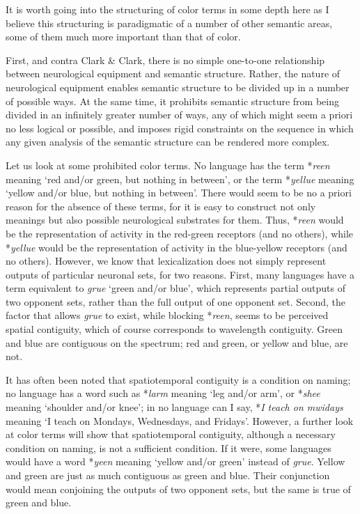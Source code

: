 It is worth going into the structuring of color terms in some depth here as I believe this structuring is paradigmatic of a number of other semantic areas, some of them much more important than that of color.

First, and contra Clark \& Clark, there is no simple one-to-one relationship between neurological equipment and semantic structure. Rather, the nature of neurological equipment enables semantic structure to be divided up in a number of possible ways. At the same time, it prohibits semantic structure from being divided in an infinitely greater number of ways, any of which might seem a priori no less logical or possible, and imposes rigid constraints on the sequence in which any given analysis of the semantic structure can be rendered more complex.

Let us look at some prohibited color terms. No language has the term *\textit{reen} meaning `red and/or green, but nothing in between', or the term *\textit{yellue} meaning `yellow and/or blue, but nothing in between'. There would seem to be no a priori reason for the absence of these terms, for it is easy to construct not only meanings but also possible neurological substrates for them. Thus, *\textit{reen} would be the representation of activity in the red-green receptors (and no others), while *\textit{yellue} would be the representation of activity in the blue-yellow receptors (and no others). However, we know that lexicalization does not simply represent outputs of particular neuronal sets, for two reasons. First, many languages have a term equivalent to \textit{grue} `green and/or blue', which represents partial outputs of two opponent sets, rather than the full output of one opponent set. Second, the factor that allows \textit{grue} to exist, while blocking *\textit{reen}, seems to be perceived spatial contiguity, which of course corresponds to wavelength contiguity. Green and blue are contiguous on the spectrum; red and green, or yellow and blue, are not.

It has often been noted that spatiotemporal contiguity is a condition on naming; no language has a word such as *\textit{larm} meaning `leg and/or arm', or *\textit{shee} meaning `shoulder and/or knee'; in no language can I say, *\textit{I teach on mwidays} meaning `I teach on Mondays, Wednesdays, and Fridays'. However, a further look at color terms will show that spatiotemporal contiguity, although a necessary condition on naming, is not a sufficient condition. If it were, some languages would have a word *\textit{yeen} meaning `yellow and/or green' instead of \textit{grue}. Yellow and green are just as much contiguous as green and blue. Their conjunction would mean conjoining the outputs of two opponent sets, but the same is true of green and blue.

